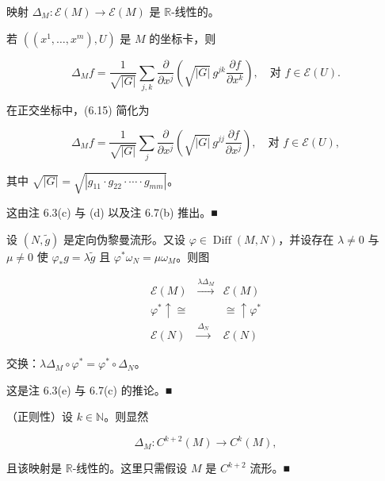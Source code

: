\begin{remark}

\begin{items}
\item

映射 $ \Delta_M: \mathcal{E}(M) \to \mathcal{E}(M) $ 是 $ \mathbb{R} $-线性的。

\item

若 $ ((x^1,\ldots,x^m),U) $ 是 $ M $ 的坐标卡，则

\begin{equation}
\Delta_{M} f = \frac{1}{\sqrt{|G|}}\sum_{j,k}\frac{\partial}{\partial x^{j}}\left(\sqrt{|G|}\,g^{jk}\frac{\partial f}{\partial x^{k}}\right), \quad \text{对 } f \in \mathcal{E}(U).\tag{6.15}
\end{equation}

在正交坐标中，(6.15) 简化为

\begin{equation}
\Delta_{M} f = \frac{1}{\sqrt{|G|}}\sum_{j}\frac{\partial}{\partial x^{j}}\left(\sqrt{|G|}\,g^{jj}\frac{\partial f}{\partial x^{j}}\right), \quad \text{对 } f \in \mathcal{E}(U),\tag{6.16}
\end{equation}

其中 $ \sqrt{|G|} = \sqrt{|g_{11}\cdot g_{22}\cdot\cdots\cdot g_{mm}|} $。

\proofhead
这由注 6.3(c) 与 (d) 以及注 6.7(b) 推出。\nobreak\hspace{0.35em}■
\end{items}

\begin{items}
\item[（c）]

设 $ (N,\tilde{g}) $ 是定向伪黎曼流形。又设 $ \varphi \in \operatorname{Diff}(M,N) $，并设存在 $ \lambda \ne 0 $ 与 $ \mu \ne 0 $ 使 $ \varphi_{*}g = \lambda\tilde{g} $ 且 $ \varphi^{*}\omega_N = \mu\omega_M $。则图

\begin{equation*}
\begin{array}{ccc} \mathcal{E}(M) & \xrightarrow{\lambda\Delta_{M}} & \mathcal{E}(M) \\ \varphi^{*}\uparrow\cong & & \cong\uparrow\varphi^{*} \\ \mathcal{E}(N) & \xrightarrow{\Delta_{N}} & \mathcal{E}(N) \end{array}
\end{equation*}

交换：$ \lambda\Delta_M\circ\varphi^{*} = \varphi^{*}\circ\Delta_N $。

\proofhead
这是注 6.3(e) 与 6.7(c) 的推论。\nobreak\hspace{0.35em}■
\item[（d）]

（正则性）设 $ k \in \mathbb{N} $。则显然

\[
\Delta_{M}: C^{k+2}(M) \to C^{k}(M),
\]

且该映射是 $ \mathbb{R} $-线性的。这里只需假设 $ M $ 是 $ C^{k+2} $ 流形。\nobreak\hspace{0.35em}■

\end{items}

\end{remark}
